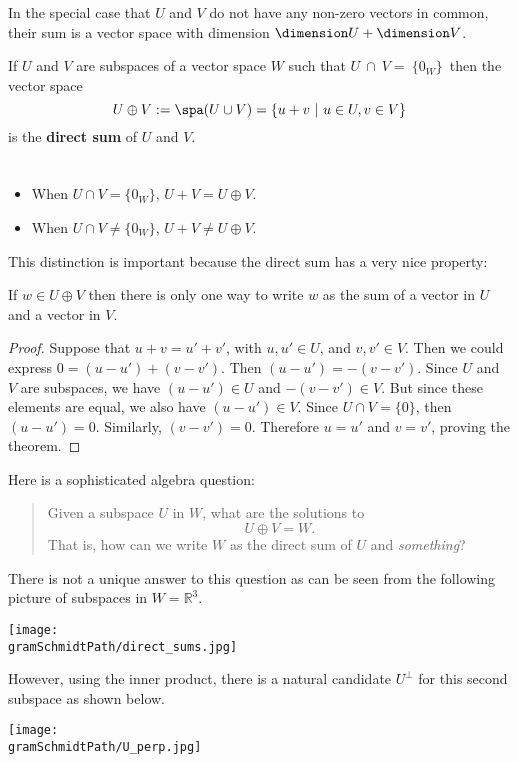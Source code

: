 In the special case that $U$ and $V$ do not have any non-zero vectors in common, their sum is a vector space with dimension $\dimension U + \dimension V$. 


\begin{definition}
If  $U$ and $V$ are subspaces of a vector space $W$ such that 
$U~\cap~V=~\{0_W\}\, $
then the vector space
\[
U \oplus V := \spa (U\cup V)= \{u+v ~|~ u\in U, v\in V \}
\]
is the {\bfseries direct sum} of $U$ and $V$.
\end{definition}

\begin{remark}

$\phantom{JUNK HERE}$\\[-8mm]

\begin{itemize}
\item When $U\cap V= \{0_W\}$, $U+V=U\oplus V.$ 
\item When $U\cap V \neq \{0_W\}$, $U+V \neq U\oplus V$.
\end{itemize}
\end{remark}

\noindent This distinction is important because the direct sum has a very nice property:

\begin{theorem}
If $w\in U\oplus V$  then 
there is only one way to write \(w\) as the sum of a vector in \(U\) and a vector in \(V\).  
\end{theorem}

\begin{proof}
Suppose that $u+v=u'+v'$, with $u,u'\in U$, and $v,v' \in V$.  Then we could express $0=(u-u')+(v-v')$.  Then $(u-u')=-(v-v')$.  Since $U$ and $V$ are subspaces, we have $(u-u')\in U$ and $-(v-v')\in V$.  But since these elements are equal, we also have $(u-u')\in V$.  Since $U\cap V=\{0\}$, then $(u-u')=0$.  Similarly, $(v-v')=0$. Therefore $u=u'$ and  $v=v'$, proving the theorem. 
\end{proof}



\noindent Here is a sophisticated algebra question:
\begin{quote}
Given a subspace $U$ in $W$, what are the solutions to 
\[ U\oplus V =W.\]
That is, how can we write $W$ as the direct sum of $U$ and \emph{something}? 
\end{quote}
There is not a unique answer to this question as can be seen from the following picture of subspaces in $W={\mathbb R}^3$. 
\begin{center}
\texttt{[image: \\gramSchmidtPath/direct\_sums.jpg]}
\end{center}
However, using the inner product, there is a natural candidate $U^\perp$ for this second subspace as shown below.
\begin{center}
\texttt{[image: \\gramSchmidtPath/U\_perp.jpg]}
\end{center}


